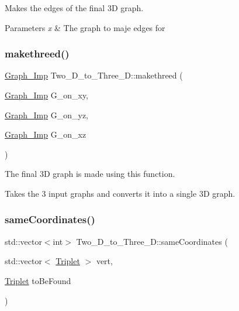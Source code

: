 Makes the edges of the final 3D graph. 


\begin{DoxyParams}{Parameters}
{\em x} & The graph to maje edges for \\
\hline
\end{DoxyParams}
\mbox{\label{class_two___d__to___three___d_adfa674d5d9cbf192efda76d5b7489bf8}} 
\subsubsection{\texorpdfstring{makethreed()}{makethreed()}}
{\footnotesize\ttfamily \mbox{\hyperlink{class_graph___imp}{Graph\+\_\+\+Imp}} Two\+\_\+\+D\+\_\+to\+\_\+\+Three\+\_\+\+D\+::makethreed (\begin{DoxyParamCaption}\item[{\mbox{\hyperlink{class_graph___imp}{Graph\+\_\+\+Imp}}}]{G\+\_\+on\+\_\+xy,  }\item[{\mbox{\hyperlink{class_graph___imp}{Graph\+\_\+\+Imp}}}]{G\+\_\+on\+\_\+yz,  }\item[{\mbox{\hyperlink{class_graph___imp}{Graph\+\_\+\+Imp}}}]{G\+\_\+on\+\_\+xz }\end{DoxyParamCaption})}



The final 3D graph is made using this function. 

Takes the 3 input graphs and converts it into a single 3D graph. \mbox{\label{class_two___d__to___three___d_addf6a41c6a1f93e172362ef42e5a3ca3}} 
\subsubsection{\texorpdfstring{same\+Coordinates()}{sameCoordinates()}}
{\footnotesize\ttfamily std\+::vector$<$int$>$ Two\+\_\+\+D\+\_\+to\+\_\+\+Three\+\_\+\+D\+::same\+Coordinates (\begin{DoxyParamCaption}\item[{std\+::vector$<$ \mbox{\hyperlink{struct_triplet}{Triplet}} $>$}]{vert,  }\item[{\mbox{\hyperlink{struct_triplet}{Triplet}}}]{to\+Be\+Found }\end{DoxyParamCaption})}



